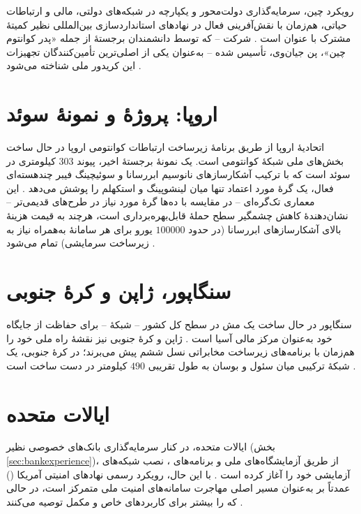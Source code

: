 رویکرد چین، سرمایه‌گذاری دولت‌محور و یکپارچه در شبکه‌های دولتی، مالی و ارتباطات حیاتی، هم‌زمان با نقش‌آفرینی فعال در نهادهای استانداردسازی بین‌المللی نظیر کمیتهٔ مشترک  با عنوان  است \Cite{iiss2026governance}. شرکت  -- که توسط دانشمندان برجستهٔ  از جمله «پدر کوانتوم چین»، پن جیان‌وی، تأسیس شده -- به‌عنوان یکی از اصلی‌ترین تأمین‌کنندگان تجهیزات این کریدور ملی شناخته می‌شود \Cite{itif2024china}.

\section{اروپا: پروژهٔ  و نمونهٔ سوئد}

اتحادیهٔ اروپا از طریق برنامهٔ زیرساخت ارتباطات کوانتومی اروپا  در حال ساخت بخش‌های ملی شبکهٔ کوانتومی است. یک نمونهٔ برجستهٔ اخیر، پیوند $303$ کیلومتری در سوئد است که با ترکیب آشکارسازهای نانوسیم ابررسانا  و سوئیچینگ فیبر چندهسته‌ای فعال، یک گرهٔ مورد اعتماد تنها میان لینشوپینگ و استکهلم را پوشش می‌دهد \Cite{arxiv2606sweden,techtimes2026sweden}. این معماری تک‌گره‌ای -- در مقایسه با ده‌ها گرهٔ مورد نیاز در طرح‌های قدیمی‌تر -- نشان‌دهندهٔ کاهش چشمگیر سطح حملهٔ قابل‌بهره‌برداری  است، هرچند به قیمت هزینهٔ بالای آشکارسازهای ابررسانا (در حدود $100000$ یورو برای هر سامانهٔ  به‌همراه نیاز به زیرساخت سرمایشی) تمام می‌شود \Cite{techtimes2026sweden}.

\section{سنگاپور، ژاپن و کرهٔ جنوبی}

سنگاپور در حال ساخت یک مش  در سطح کل کشور -- شبکهٔ  -- برای حفاظت از جایگاه خود به‌عنوان مرکز مالی آسیا است \Cite{marketintelo2026}. ژاپن و کرهٔ جنوبی نیز نقشهٔ راه ملی  خود را هم‌زمان با برنامه‌های زیرساخت مخابراتی نسل ششم  پیش می‌برند؛ در کرهٔ جنوبی، یک شبکهٔ ترکیبی میان سئول و بوسان به طول تقریبی $490$ کیلومتر در دست ساخت است \Cite{npl2020progress}.

\section{ایالات متحده}

ایالات متحده، در کنار سرمایه‌گذاری بانک‌های خصوصی نظیر  (بخش \ref{sec:bankexperience})، از طریق آزمایشگاه‌های ملی و برنامه‌های ، نصب شبکه‌های آزمایشی  خود را آغاز کرده است \Cite{npjqi2016}. با این حال، رویکرد رسمی نهادهای امنیتی آمریکا () عمدتاً بر  به‌عنوان مسیر اصلی مهاجرت سامانه‌های امنیت ملی متمرکز است، در حالی که  را بیشتر برای کاربردهای خاص و مکمل توصیه می‌کنند \Cite{techtimes2026sweden}.


